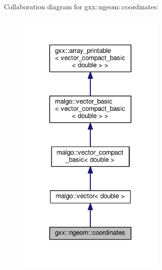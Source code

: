 Collaboration diagram for gxx\+:\+:ngeom\+:\+:coordinates\+:
\nopagebreak
\begin{figure}[H]
\begin{center}
\leavevmode
\includegraphics[width=204pt]{classgxx_1_1ngeom_1_1coordinates__coll__graph}
\end{center}
\end{figure}
